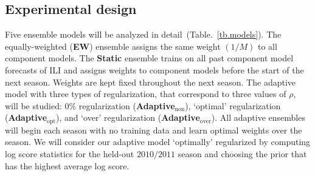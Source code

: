 \documentclass[sagev,times,Review,10pt]{sagej}
\begin{document}
\subsection{Experimental design}

Five ensemble models will be analyzed in detail~(Table.~\ref{tb.models}).
The equally-weighted ({\bf EW}) ensemble assigns the same weight $(1/M)$ to all component models.
The {\bf Static} ensemble trains on all past component model forecasts of ILI and assigns weights to component models before the start of the next season.
Weights are kept fixed throughout the next season.
The adaptive model with three types of regularization, that correspond to three values of $\rho$, will be studied: 0\% regularization ({\bf Adaptive$_{\text{non}}$}), `optimal' regularization ({\bf Adaptive$_{\text{opt}}$}), and `over' regularization ({\bf Adaptive$_{\text{over}}$}).
All adaptive ensembles will begin each season with no training data and learn optimal weights over the season.
We will consider our adaptive model `optimally' regularized by computing log score statistics for the held-out $2010/2011$ season and choosing the prior that has the highest average log score.

\end{document}
